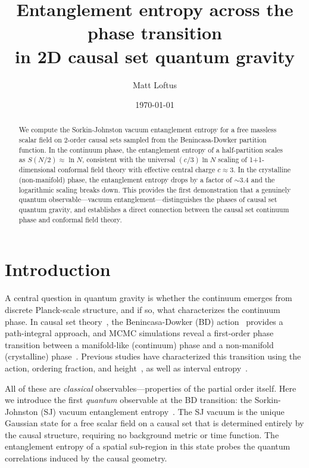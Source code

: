 \documentclass[aps,prd,twocolumn,superscriptaddress,nofootinbib]{revtex4-2}
\begin{document}
\title{Entanglement entropy across the phase transition\\in 2D causal set quantum gravity}

\author{Matt Loftus}

\date{\today}

\begin{abstract}
We compute the Sorkin-Johnston vacuum entanglement entropy for a free massless scalar field on 2-order causal sets sampled from the Benincasa-Dowker partition function. In the continuum phase, the entanglement entropy of a half-partition scales as $S(N/2) \approx \ln N$, consistent with the universal $(c/3)\ln N$ scaling of 1+1-dimensional conformal field theory with effective central charge $c \approx 3$. In the crystalline (non-manifold) phase, the entanglement entropy drops by a factor of $\sim$3.4 and the logarithmic scaling breaks down. This provides the first demonstration that a genuinely quantum observable---vacuum entanglement---distinguishes the phases of causal set quantum gravity, and establishes a direct connection between the causal set continuum phase and conformal field theory.
\end{abstract}

\maketitle

\section{Introduction}

A central question in quantum gravity is whether the continuum emerges from discrete Planck-scale structure, and if so, what characterizes the continuum phase. In causal set theory~\cite{bombelli1987,surya2019}, the Benincasa-Dowker (BD) action~\cite{benincasa2010} provides a path-integral approach, and MCMC simulations reveal a first-order phase transition between a manifold-like (continuum) phase and a non-manifold (crystalline) phase~\cite{surya2012,glaser2018}. Previous studies have characterized this transition using the action, ordering fraction, and height~\cite{surya2012,glaser2018}, as well as interval entropy~\cite{loftus2026a}.

All of these are \emph{classical} observables---properties of the partial order itself. Here we introduce the first \emph{quantum} observable at the BD transition: the Sorkin-Johnston (SJ) vacuum entanglement entropy~\cite{johnston2009,sorkin2012}. The SJ vacuum is the unique Gaussian state for a free scalar field on a causal set that is determined entirely by the causal structure, requiring no background metric or time function. The entanglement entropy of a spatial sub-region in this state probes the quantum correlations induced by the causal geometry.
\end{document}
